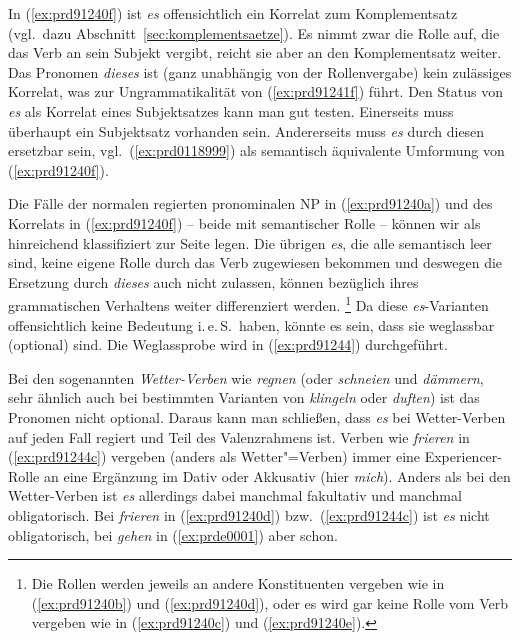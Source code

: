 In (\ref{ex:prd91240f}) ist \textit{es} offensichtlich ein Korrelat zum Komplementsatz (vgl.\ dazu Abschnitt~\ref{sec:komplementsaetze}).
Es nimmt zwar die Rolle auf, die das Verb an sein Subjekt vergibt, reicht sie aber an den Komplementsatz weiter.
Das Pronomen \textit{dieses} ist (ganz unabhängig von der Rollenvergabe) kein zulässiges Korrelat, was zur Ungrammatikalität von (\ref{ex:prd91241f}) führt.
Den Status von \textit{es} als Korrelat eines Subjektsatzes kann man gut testen.
Einerseits muss überhaupt ein Subjektsatz vorhanden sein.
Andererseits muss \textit{es} durch diesen ersetzbar sein, vgl.\ (\ref{ex:prd0118999}) als semantisch äquivalente Umformung von (\ref{ex:prd91240f}).

\begin{exe}
\end{exe}

Die Fälle der normalen regierten pronominalen NP in (\ref{ex:prd91240a}) und des Korrelats in (\ref{ex:prd91240f}) -- beide mit semantischer Rolle -- können wir als hinreichend klassifiziert zur Seite legen.
Die übrigen \textit{es}, die alle semantisch leer sind, keine eigene Rolle durch das Verb zugewiesen bekommen und deswegen die Ersetzung durch \textit{dieses} auch nicht zulassen, können bezüglich ihres grammatischen Verhaltens weiter differenziert werden.%
\footnote{Die Rollen werden jeweils an andere Konstituenten vergeben wie in (\ref{ex:prd91240b}) und (\ref{ex:prd91240d}), oder es wird gar keine Rolle vom Verb vergeben wie in (\ref{ex:prd91240c}) und (\ref{ex:prd91240e}).}
Da diese \textit{es}-Varianten offensichtlich keine Bedeutung i.\,e.\,S.\ haben, könnte es \zB sein, dass sie weglassbar (optional) sind.
Die Weglassprobe wird in (\ref{ex:prd91244}) durchgeführt.

\begin{exe}
  \ex\label{ex:prd91244}
  \begin{xlist}
  \end{xlist}
\end{exe}


Bei den sogenannten \textit{Wetter-Verben} wie \textit{regnen} (oder \textit{schneien} und \textit{dämmern}, sehr ähnlich auch bei bestimmten Varianten von \textit{klingeln} oder \textit{duften}) ist das Pronomen nicht optional.
Daraus kann man schließen, dass \textit{es} bei Wetter-Verben auf jeden Fall regiert und Teil des Valenzrahmens ist.
Verben wie \textit{frieren} in (\ref{ex:prd91244c}) vergeben (anders als Wetter"=Verben) immer eine Experiencer-Rolle an eine Ergänzung im Dativ oder Akkusativ (hier \textit{mich}).
Anders als bei den Wetter-Verben ist \textit{es} allerdings dabei manchmal fakultativ und manchmal obligatorisch.
Bei \textit{frieren} in (\ref{ex:prd91240d}) bzw.\ (\ref{ex:prd91244c}) ist \textit{es} nicht obligatorisch, bei \textit{gehen} in (\ref{ex:prde0001}) aber schon.

